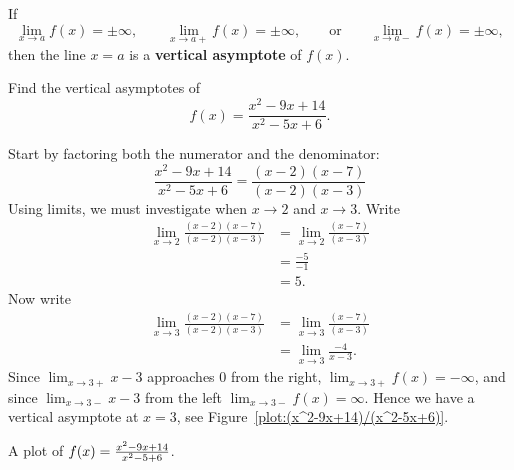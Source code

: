 \begin{definition}\label{def:vert asymptote}
If 
\[
\lim_{x\to a} f(x) = \pm\infty, \qquad \lim_{x\to a+} f(x) = \pm\infty, \qquad\text{or}\qquad \lim_{x\to a-} f(x) = \pm\infty,
\]
then the line $x=a$ is a \textbf{vertical asymptote} of $f(x)$.
\end{definition}


\begin{example}
Find the vertical asymptotes of 
\[
f(x) = \frac{x^2-9x+14}{x^2-5x+6}.
\]
\end{example}
\begin{solution}
Start by factoring both the numerator and the denominator:
\[
\frac{x^2-9x+14}{x^2-5x+6} = \frac{(x-2)(x-7)}{(x-2)(x-3)}
\]
Using limits, we must investigate when $x\to 2$ and $x\to 3$. Write
\begin{align*}
\lim_{x\to 2} \frac{(x-2)(x-7)}{(x-2)(x-3)} &= \lim_{x\to 2} \frac{(x-7)}{(x-3)}\\
&= \frac{-5}{-1}\\
&=5.
\end{align*}
Now write
\begin{align*}
\lim_{x\to 3} \frac{(x-2)(x-7)}{(x-2)(x-3)} &= \lim_{x\to 3} \frac{(x-7)}{(x-3)}\\
&= \lim_{x\to 3}\frac{-4}{x-3}.
\end{align*}
Since $\lim_{x\to 3+} x-3$ approaches $0$ from the right, $\lim_{x\to
  3+} f(x) = -\infty$, and since $\lim_{x\to 3-} x-3$ from the left
$\lim_{x\to 3-} f(x) = \infty$. Hence we have a vertical asymptote at
$x=3$, see Figure~\ref{plot:(x^2-9x+14)/(x^2-5x+6)}.
\end{solution}
\begin{marginfigure}[-4in]
\caption{A plot of $f(x)=\protect\frac{x^2-9x+14}{x^2-5+6}$.}
\label{plot:(x^2-9x+14)/(x^2-5x+6)}
\end{marginfigure}


